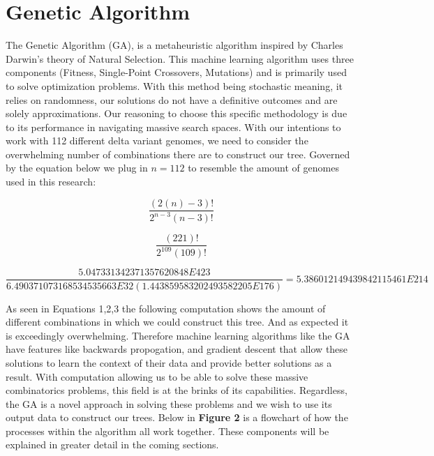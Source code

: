\section{Genetic Algorithm}

The Genetic Algorithm (GA), is a metaheuristic algorithm inspired by Charles Darwin's theory of Natural Selection. 
This machine learning algorithm uses three components (Fitness, Single-Point Crossovers, Mutations) and is primarily used to solve optimization problems. 
With this method being stochastic meaning, it relies on randomness, our solutions do not have a definitive outcomes and are solely approximations. 
Our reasoning to choose this specific methodology is due to its performance in navigating massive search spaces. 
With our intentions to work with 112 different delta variant genomes, we need to consider the overwhelming number of combinations there are to construct our tree. 
Governed by the equation below we plug in $n = 112$ to resemble the amount of genomes used in this research:

\begin{equation}
\label{Combinations}
\frac{(2(n)-3)!}{2^{n-3}(n-3)!}
\end{equation}

\begin{equation}
\label{Combinations2}
\frac{(221)!}{2^{109}(109)!}
\end{equation}

\begin{equation}
\label{Combinations3}
\frac{5.047331342371357620848E423}{6.490371073168534535663E32(1.443859583202493582205E176)} = 5.386012149439842115461E214
\end{equation}

As seen in Equations 1,2,3 the following computation shows the amount of different combinations in which we could construct this tree. 
And as expected it is exceedingly overwhelming. 
Therefore machine learning algorithms like the GA have features like backwards propogation, and gradient descent that allow these solutions to learn the context of their data and provide better solutions as a result. 
With computation allowing us to be able to solve these massive combinatorics problems, this field is at the brinks of its capabilities. 
Regardless, the GA is a novel approach in solving these problems and we wish to use its output data to construct our trees. 
Below in \textbf{Figure 2} is a flowchart of how the processes within the algorithm all work together. 
These components will be explained in greater detail in the coming sections.

